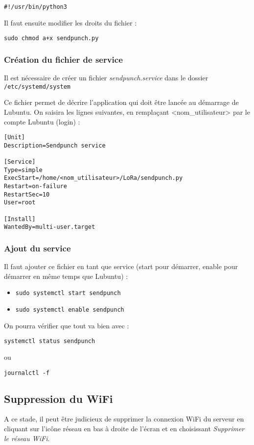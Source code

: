 \documentclass[a4paper]{ffco-rapport}
\begin{document}
			\verb|#!/usr/bin/python3|
			
			Il faut ensuite modifier les droits du fichier :
			
			\verb|sudo chmod a+x sendpunch.py|
		
		\subsubsection{Création du fichier de service}
			Il est nécessaire de créer un fichier \emph{sendpunch.service} dans le dossier \texttt{/etc/systemd/system}
			
			Ce fichier permet de décrire l'application qui doit être lancée au démarrage de Lubuntu. On saisira les lignes suivantes, en remplaçant \og{}<nom\_utilisateur>\fg{} par le compte Lubuntu (login) :
			
			\begin{verbatim}
[Unit]
Description=Sendpunch service

[Service]
Type=simple
ExecStart=/home/<nom_utilisateur>/LoRa/sendpunch.py
Restart=on-failure
RestartSec=10
User=root

[Install]
WantedBy=multi-user.target			
			\end{verbatim}

		\subsubsection{Ajout du service}
			Il faut ajouter ce fichier en tant que service (start pour démarrer, enable pour démarrer en même temps que Lubuntu) :
			
			\begin{itemize}
				\item \verb|sudo systemctl start sendpunch|
				\item \verb|sudo systemctl enable sendpunch|
			\end{itemize}

			On pourra vérifier que tout va bien avec :

				\verb|systemctl status sendpunch|
			
			ou
			
				\verb|journalctl -f|
			
			

	\subsection{Suppression du WiFi}
	A ce stade, il peut être judicieux de supprimer la connexion WiFi du serveur en cliquant sur l’icône réseau en bas à droite de l'écran et en choisissant \emph{Supprimer le réseau WiFi}.
\end{document}
